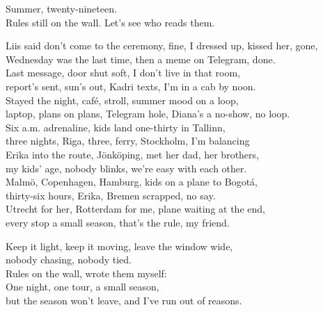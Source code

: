 \begin{lyrics}
Summer, twenty-nineteen.\\
Rules still on the wall. Let’s see who reads them.

Liis said don’t come to the ceremony, fine, I dressed up, kissed her, gone,\\
Wednesday was the last time, then a meme on Telegram, done.\\
Last message, door shut soft, I don’t live in that room,\\
report’s sent, sun’s out, Kadri texts, I’m in a cab by noon.\\
Stayed the night, café, stroll, summer mood on a loop,\\
laptop, plans on plans, Telegram hole, Diana’s a no-show, no loop.\\
Six a.m. adrenaline, kids land one-thirty in Tallinn,\\
three nights, Riga, three, ferry, Stockholm, I’m balancing\\
Erika into the route, Jönköping, met her dad, her brothers,\\
my kids’ age, nobody blinks, we’re easy with each other.\\
Malmö, Copenhagen, Hamburg, kids on a plane to Bogotá,\\
thirty-six hours, Erika, Bremen scrapped, no say.\\
Utrecht for her, Rotterdam for me, plane waiting at the end,\\
every stop a small season, that’s the rule, my friend.

Keep it light, keep it moving, leave the window wide,\\
nobody chasing, nobody tied.\\
Rules on the wall, wrote them myself:\\
One night, one tour, a small season,\\
but the season won’t leave, and I’ve run out of reasons.


\end{lyrics}
